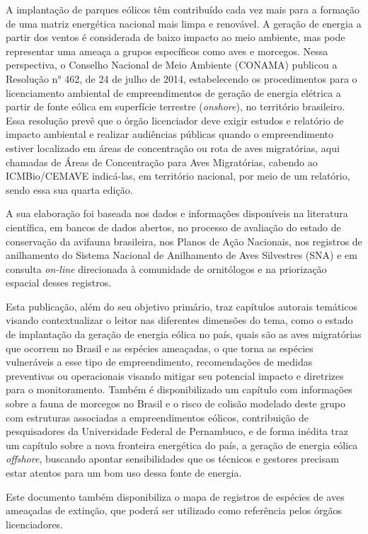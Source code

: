 \documentclass[
  oneside]{scrbook}
\begin{document}
A implantação de parques eólicos têm contribuído cada vez mais para a formação de uma matriz energética nacional mais limpa e renovável. A geração de energia a partir dos ventos é considerada de baixo impacto ao meio ambiente, mas pode representar uma ameaça a grupos específicos como aves e morcegos. Nessa perspectiva, o Conselho Nacional de Meio Ambiente (CONAMA) publicou a Resolução n° 462, de 24 de julho de 2014, estabelecendo os procedimentos para o licenciamento ambiental de empreendimentos de geração de energia elétrica a partir de fonte eólica em superfície terrestre (\emph{onshore}), no território brasileiro. Essa resolução prevê que o órgão licenciador deve exigir estudos e relatório de impacto ambiental e realizar audiências públicas quando o empreendimento estiver localizado em áreas de concentração ou rota de aves migratórias, aqui chamadas de Áreas de Concentração para Aves Migratórias, cabendo ao ICMBio/CEMAVE indicá-las, em território nacional, por meio de um relatório, sendo essa sua quarta edição.

A sua elaboração foi baseada nos dados e informações disponíveis na literatura científica, em bancos de dados abertos, no processo de avaliação do estado de conservação da avifauna brasileira, nos Planos de Ação Nacionais, nos registros de anilhamento do Sistema Nacional de Anilhamento de Aves Silvestres (SNA) e em consulta \emph{on-line} direcionada à comunidade de ornitólogos e na priorização espacial desses registros.

Esta publicação, além do seu objetivo primário, traz capítulos autorais temáticos visando contextualizar o leitor nas diferentes dimensões do tema, como o estado de implantação da geração de energia eólica no país, quais são as aves migratórias que ocorrem no Brasil e as espécies ameaçadas, o que torna as espécies vulneráveis a esse tipo de empreendimento, recomendações de medidas preventivas ou operacionais visando mitigar seu potencial impacto e diretrizes para o monitoramento. Também é disponibilizado um capítulo com informações sobre a fauna de morcegos no Brasil e o risco de colisão modelado deste grupo com estruturas associadas a empreendimentos eólicos, contribuição de pesquisadores da Universidade Federal de Pernambuco, e de forma inédita traz um capítulo sobre a nova fronteira energética do país, a geração de energia eólica \emph{offshore}, buscando apontar sensibilidades que os técnicos e gestores precisam estar atentos para um bom uso dessa fonte de energia.

Este documento também disponibiliza o mapa de registros de espécies de aves ameaçadas de extinção, que poderá ser utilizado como referência pelos órgãos licenciadores.
\end{document}

